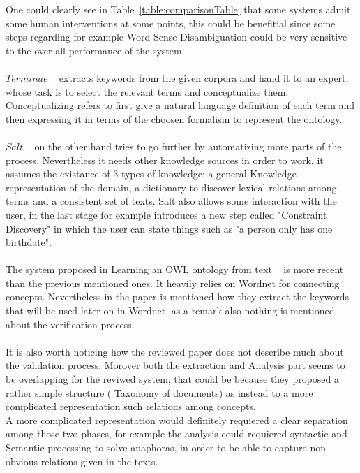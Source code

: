 \documentclass[4pt,a4paper,twocolumn]{article}
\begin{document}
One could clearly see in Table~\ref{table:comparisonTable} that some systems admit some human interventions at some points, this could be benefitial since some steps regarding for example Word Sense Disambiguation could be very sensitive to the over all performance of the system.\\
\\
$Terminae$ ~\cite{BiebowSzulman:99} extracts keywords from the given corpora and hand it to an expert, whose task is to select the relevant terms and conceptualize them. Conceptualizing refers to first give a natural language definition of each term and then expressing it in terms of the choosen formalism to represent the ontology.\\
\\
$Salt$ ~\cite{Lonsdale02pepperingknowledge} on the other hand tries to go further by automatizing more parts of the process. Nevertheless it needs other knowledge sources in order to work. it assumes the existance of 3 types of knowledge: a general Knowledge representation of the domain, a dictionary to discover lexical relations among terms and a consistent set of texts. Salt also allows some interaction with the user, in the last stage for example introduces a new step called "Constraint Discovery" in which the user can state things such as "a person only has one birthdate". \\
\\
The system proposed in Learning an OWL ontology from text ~\cite{citeulike:136652} is more recent than the previous mentioned ones. It heavily relies on Wordnet for connecting concepts. Nevertheless in the paper is mentioned how they extract the keywords that will be used later on in Wordnet, as a remark also nothing is mentioned about the verification process.\\
\\
It is also worth noticing how the reviewed paper does not describe much about the validation process.
Morover both the extraction and Analysis part seems to be overlapping for the reviwed system, that could be because they proposed a rather simple structure ( Taxonomy of documents) as instead to a more complicated representation such relations among concepts.\\
A more complicated representation would definitely requiered a clear separation among those two phases, for example the analysis could requiered syntactic and Semantic processing to solve anaphoras, in order to be able to capture non-obvious relations given in the texts.
\end{document}
